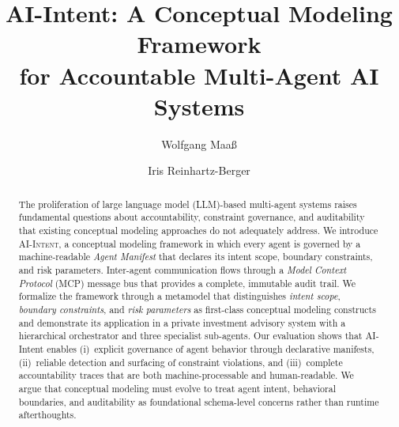 \documentclass[runningheads]{llncs}
\begin{document}
\title{AI-Intent: A Conceptual Modeling Framework\\for Accountable Multi-Agent AI Systems}

\author{Wolfgang Maa\ss{} \and Iris Reinhartz-Berger}



\maketitle

\begin{abstract}
The proliferation of large language model (LLM)-based multi-agent systems raises fundamental questions about accountability, constraint governance, and auditability that existing conceptual modeling approaches do not adequately address. We introduce \textsc{AI-Intent}, a conceptual modeling framework in which every agent is governed by a machine-readable \emph{Agent Manifest} that declares its intent scope, boundary constraints, and risk parameters. Inter-agent communication flows through a \emph{Model Context Protocol} (MCP) message bus that provides a complete, immutable audit trail. We formalize the framework through a metamodel that distinguishes \emph{intent scope}, \emph{boundary constraints}, and \emph{risk parameters} as first-class conceptual modeling constructs and demonstrate its application in a private investment advisory system with a hierarchical orchestrator and three specialist sub-agents. Our evaluation shows that AI-Intent enables (i)~explicit governance of agent behavior through declarative manifests, (ii)~reliable detection and surfacing of constraint violations, and (iii)~complete accountability traces that are both machine-processable and human-readable. We argue that conceptual modeling must evolve to treat agent intent, behavioral boundaries, and auditability as foundational schema-level concerns rather than runtime afterthoughts.

\end{abstract}
\end{document}
